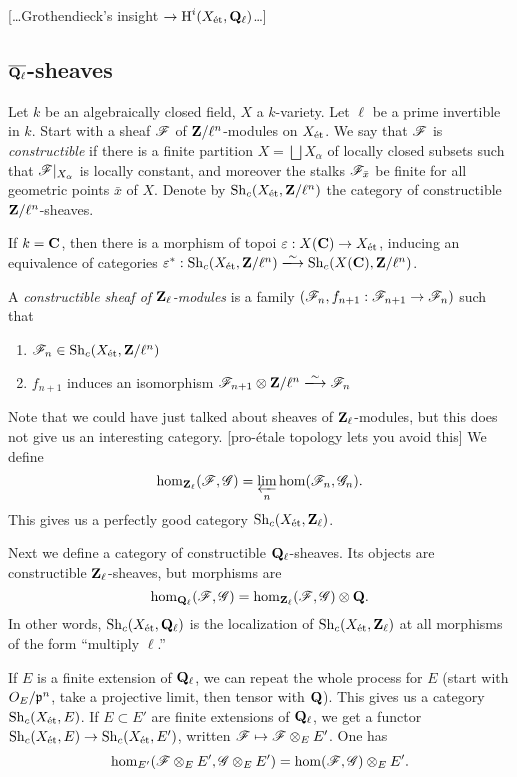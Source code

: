 \documentclass{article}
\begin{document}
[\ldots Grothendieck's insight $\to\operatorname{H}^i(X_{\textnormal{\'et}}, \mathbf{Q}_\ell)$\ldots]


\subsection{\texorpdfstring{$\overline{\mathbf{Q}_\ell}$}{barQl}-sheaves}

Let $k$ be an algebraically closed field, $X$ a $k$-variety. Let $\ell$ be 
a prime invertible in $k$. Start with a sheaf $\mathscr{F}$ of 
$\mathbf{Z}/\ell^n$-modules on $X_{\textnormal{\'et}}$. We say that $\mathscr{F}$ is \emph{constructible} 
if there is a finite partition $X=\bigsqcup X_\alpha$ of locally closed 
subsets such that $\mathscr{F}|_{X_\alpha}$ is locally constant, and moreover 
the stalks $\mathscr{F}_{\bar x}$ be finite for all geometric points $\bar x$ of $X$. 
Denote by $\operatorname{Sh}_c(X_{\textnormal{\'et}}, \mathbf{Z}/\ell^n)$ the category of constructible 
$\mathbf{Z}/\ell^n$-sheaves. 

If $k=\mathbf{C}$, then there is a morphism of topoi $\varepsilon:X(\mathbf{C}) \to X_{\textnormal{\'et}}$, 
inducing an equivalence of categories 
$\varepsilon^\ast:\sheaf_c(X_\etale,\dZ/\ell^n)\isomorphism \sheaf_c(X(\dC),\dZ/\ell^n)$. 

A \emph{constructible sheaf of $\mathbf{Z}_\ell$-modules} is a family 
$(\mathscr{F}_n,f_{n+1}:\mathscr{F}_{n+1} \to \mathscr{F}_n)$ such that 
\begin{enumerate}
  \item $\mathscr{F}_n\in \operatorname{Sh}_c(X_{\textnormal{\'et}},\mathbf{Z}/\ell^n)$ 
  \item $f_{n+1}$ induces an isomorphism $\sF_{n+1}\otimes \dZ/\ell^n \isomorphism \sF_n$ 
\end{enumerate}
Note that we could have just talked about sheaves of $\mathbf{Z}_\ell$-modules, but 
this does not give us an interesting category. [pro-\'etale topology lets you 
avoid this] We define 
\[
  \hom_{\mathbf{Z}_\ell}(\mathscr{F},\mathscr{G}) = \varprojlim_n \hom(\mathscr{F}_n,\mathscr{G}_n) .
\]
This gives us a perfectly good category $\operatorname{Sh}_c(X_{\textnormal{\'et}},\mathbf{Z}_\ell)$. 

Next we define a category of constructible $\mathbf{Q}_\ell$-sheaves. Its objects are 
constructible $\mathbf{Z}_\ell$-sheaves, but morphisms are 
\[
  \hom_{\mathbf{Q}_\ell}(\mathscr{F},\mathscr{G}) = \hom_{\mathbf{Z}_\ell}(\mathscr{F},\mathscr{G})\otimes \mathbf{Q} .
\]
In other words, $\operatorname{Sh}_c(X_{\textnormal{\'et}},\mathbf{Q}_\ell)$ is the localization of 
$\operatorname{Sh}_c(X_{\textnormal{\'et}},\mathbf{Z}_\ell)$ at all morphisms of the form ``multiply 
$\ell$.'' 

If $E$ is a finite extension of $\mathbf{Q}_\ell$, we can repeat the whole process for 
$E$ (start with $O_E/\mathfrak{p}^n$, take a projective limit, then tensor with $\mathbf{Q}$). This 
gives us a category $\operatorname{Sh}_c(X_{\textnormal{\'et}},E)$. If $E\subset E'$ are finite extensions 
of $\mathbf{Q}_\ell$, we get a functor 
$\operatorname{Sh}_c(X_{\textnormal{\'et}},E) \to \operatorname{Sh}_c(X_{\textnormal{\'et}},E')$, written 
$\mathscr{F}\mapsto \mathscr{F}\otimes_E E'$. One has 
\[
  \hom_{E'}(\mathscr{F}\otimes_E E',\mathscr{G}\otimes_E E') = \hom(\mathscr{F},\mathscr{G})\otimes_E E' .
\]
\end{document}
